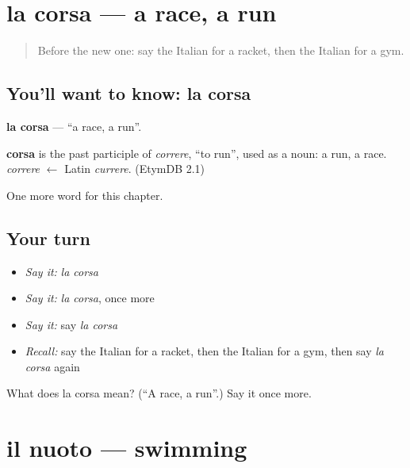 \section[la corsa]{la corsa — a race, a run}

\label{lesson:IT-C202-corsa}



\begin{quote}
Before the new one: say the Italian for a racket, then the Italian for a gym.
\end{quote}

\subsection*{You'll want to know: la corsa}
\textbf{la corsa} — \textquotedblleft{}a race, a run\textquotedblright{}.

\begin{cousinweb}
\textbf{corsa} is the past participle of \emph{correre}, \textquotedblleft{}to run\textquotedblright{}, used as a noun: a run, a race. \emph{correre} $\leftarrow$ Latin \emph{currere}. (EtymDB 2.1)
\end{cousinweb}

\begin{grammarlens}[title={What you've built}]
One more word for this chapter.
\end{grammarlens}

\subsection*{Your turn}
\begin{itemize}
\raggedright
  \item \emph{Say it:} \emph{la corsa}
  \item \emph{Say it:} \emph{la corsa}, once more
  \item \emph{Say it:} say \emph{la corsa}
  \item \emph{Recall:} say the Italian for a racket, then the Italian for a gym, then say \emph{la corsa} again
\end{itemize}

\begin{tcolorbox}[breakable,colback=teal!4,colframe=teal!35!black,title={Before you move on}]
What does la corsa mean? (\textquotedblleft{}A race, a run\textquotedblright{}.) Say it once more.
\end{tcolorbox}
\section[il nuoto]{il nuoto — swimming}

